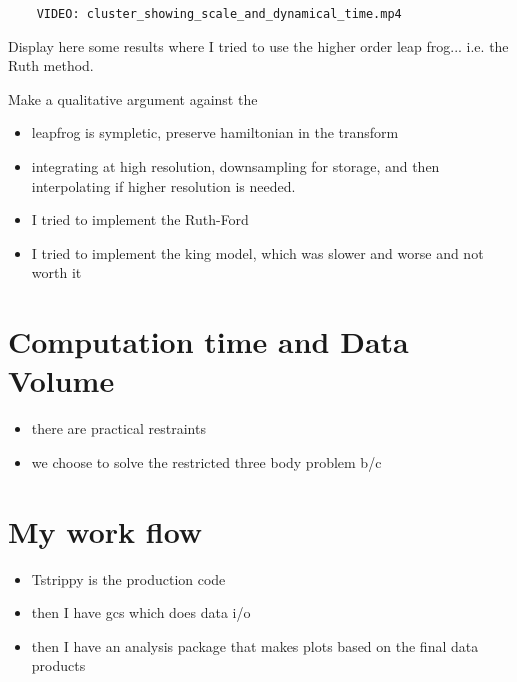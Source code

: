     \begin{verbatim}
    VIDEO: cluster_showing_scale_and_dynamical_time.mp4
    \end{verbatim}
    Display here some results where I tried to use the higher order leap frog... i.e. the Ruth method. 

    Make a qualitative argument against the 

    \begin{itemize}
        \item leapfrog is sympletic, preserve hamiltonian in the transform
        \item integrating at high resolution, downsampling for storage, and then interpolating if higher resolution is needed. 
        \item I tried to implement the Ruth-Ford
        \item I tried to implement the king model, which was slower and worse and not worth it 
    \end{itemize}


    \section{Computation time and Data Volume}
    \begin{itemize}
        \item there are practical restraints
        \item we choose to solve the restricted three body problem b/c
    \end{itemize}

\section{My work flow}
    \begin{itemize}
        \item Tstrippy is the production code
        \item then I have gcs which does data i/o
        \item then I have an analysis package that makes plots based on the final data products
    \end{itemize}


